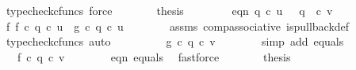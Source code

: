 \begin{isabellebody}
\ {\isacharparenleft}{\kern0pt}typecheck{\isacharunderscore}{\kern0pt}cfuncs{\isacharcomma}{\kern0pt}\ force{\isacharparenright}{\kern0pt}\isanewline
\ \ \ \ \isamarkupfalse%
\ \isamarkupfalse%
\ {\isacharquery}{\kern0pt}thesis\isacommand{{\isachardot}{\kern0pt}}\isamarkupfalse%
\isanewline
\ \ \isamarkupfalse%
\ \isanewline
\isanewline
\ \ \isamarkupfalse%
\ eqn{}{\isacharcolon}{\kern0pt}\ {\isachardoublequoteopen}q{}\ {\isasymcirc}\isactrlsub c\ u\ {\isacharequal}{\kern0pt}\ \ q{}\ \ {\isasymcirc}\isactrlsub c\ v{\isachardoublequoteclose}\isanewline
\ \ \isamarkupfalse%
\ {\isacharminus}{\kern0pt}\ \isanewline
\ \ \ \ \isamarkupfalse%
\ f{}{\isacharcolon}{\kern0pt}\ {\isachardoublequoteopen}f\ {\isasymcirc}\isactrlsub c\ q{}\ {\isasymcirc}\isactrlsub c\ u\ {\isacharequal}{\kern0pt}\ g\ {\isasymcirc}\isactrlsub c\ q{}\ {\isasymcirc}\isactrlsub c\ u{\isachardoublequoteclose}\isanewline
\ \ \ \ \ \ \isamarkupfalse%
\ assms{\isacharparenleft}{\kern0pt}{}{\isacharparenright}{\kern0pt}\ comp{\isacharunderscore}{\kern0pt}associative{}\ is{\isacharunderscore}{\kern0pt}pullback{\isacharunderscore}{\kern0pt}def\ \ \isamarkupfalse%
\ {\isacharparenleft}{\kern0pt}typecheck{\isacharunderscore}{\kern0pt}cfuncs{\isacharcomma}{\kern0pt}\ auto{\isacharparenright}{\kern0pt}\isanewline
\ \ \ \ \isamarkupfalse%
\ \isamarkupfalse%
\ {\isachardoublequoteopen}{\isachardot}{\kern0pt}{\isachardot}{\kern0pt}{\isachardot}{\kern0pt}\ {\isacharequal}{\kern0pt}\ g\ {\isasymcirc}\isactrlsub c\ q{}\ {\isasymcirc}\isactrlsub c\ v{\isachardoublequoteclose}\isanewline
\ \ \ \ \ \ \isamarkupfalse%
\ {\isacharparenleft}{\kern0pt}simp\ add{\isacharcolon}{\kern0pt}\ equals{\isacharparenright}{\kern0pt}\isanewline
\ \ \ \ \isamarkupfalse%
\ \isamarkupfalse%
\ {\isachardoublequoteopen}{\isachardot}{\kern0pt}{\isachardot}{\kern0pt}{\isachardot}{\kern0pt}\ {\isacharequal}{\kern0pt}\ f\ {\isasymcirc}\isactrlsub c\ q{}\ {\isasymcirc}\isactrlsub c\ v{\isachardoublequoteclose}\isanewline
\ \ \ \ \ \ \isamarkupfalse%
\ eqn{}\ equals\ \isamarkupfalse%
\ fastforce\isanewline
\ \ \ \ \isamarkupfalse%
\ \isamarkupfalse%
\ {\isacharquery}{\kern0pt}thesis\isanewline
\ \ \ \ \ \ \isamarkupfalse%

\end{isabellebody}
